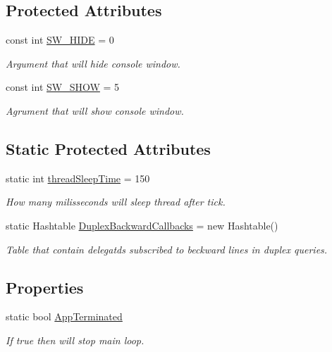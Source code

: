\subsection*{Protected Attributes}
\begin{DoxyCompactItemize}
\item 
const int \mbox{\hyperlink{class_uniform_client_1_1_base_client_a6060f2eb1d44ec518f2dfc99c8b4f7aa}{S\+W\+\_\+\+H\+I\+DE}} = 0
\begin{DoxyCompactList}\small\item\em Argument that will hide console window. \end{DoxyCompactList}\item 
const int \mbox{\hyperlink{class_uniform_client_1_1_base_client_a7545b9c72eef6cb7594a7001d3f558e4}{S\+W\+\_\+\+S\+H\+OW}} = 5
\begin{DoxyCompactList}\small\item\em Agrument that will show console window. \end{DoxyCompactList}\end{DoxyCompactItemize}
\subsection*{Static Protected Attributes}
\begin{DoxyCompactItemize}
\item 
static int \mbox{\hyperlink{class_uniform_client_1_1_base_client_a2c4762c1be5eac42b8b5d189530d0952}{thread\+Sleep\+Time}} = 150
\begin{DoxyCompactList}\small\item\em How many milisseconds will sleep thread after tick. \end{DoxyCompactList}\item 
static Hashtable \mbox{\hyperlink{class_uniform_client_1_1_base_client_a52dacc1af85cbab035a159e64e1417a0}{Duplex\+Backward\+Callbacks}} = new Hashtable()
\begin{DoxyCompactList}\small\item\em Table that contain delegatds subscribed to beckward lines in duplex queries. \end{DoxyCompactList}\end{DoxyCompactItemize}
\subsection*{Properties}
\begin{DoxyCompactItemize}
\item 
static bool \mbox{\hyperlink{class_uniform_client_1_1_base_client_a10f1c9dbb8d41719754b39344432497f}{App\+Terminated}}
\begin{DoxyCompactList}\small\item\em If true then will stop main loop. \end{DoxyCompactList}\end{DoxyCompactItemize}


